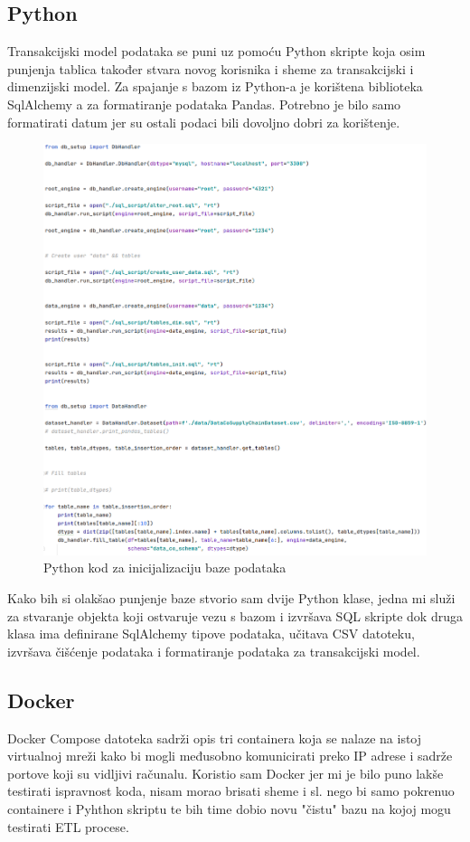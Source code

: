 \documentclass[12pt, oneside]{book}
\begin{document}
\subsection{Python}


Transakcijski model podataka se puni uz pomoću Python skripte koja osim punjenja tablica također stvara novog korisnika i sheme za transakcijski i dimenzijski model. Za spajanje s bazom iz Python-a je korištena biblioteka SqlAlchemy a za formatiranje podataka Pandas. Potrebno je bilo samo formatirati datum jer su ostali podaci bili dovoljno dobri za korištenje.

\begin{figure}[H]
\includegraphics[width=15cm]{images/i14_Python-Init.png}
\centering
\caption{Python kod za inicijalizaciju baze podataka}
\end{figure}

Kako bih si olakšao punjenje baze stvorio sam dvije Python klase, jedna mi služi za stvaranje objekta koji ostvaruje vezu s bazom i izvršava SQL skripte dok druga klasa ima definirane SqlAlchemy tipove podataka, učitava CSV datoteku, izvršava čišćenje podataka i formatiranje podataka za transakcijski model. 


\subsection{Docker}
Docker Compose datoteka sadrži opis tri containera koja se nalaze na istoj virtualnoj mreži kako bi mogli međusobno komunicirati preko IP adrese i sadrže portove koji su vidljivi računalu. Koristio sam Docker jer mi je bilo puno lakše testirati ispravnost koda, nisam morao brisati sheme i sl. nego bi samo pokrenuo containere i Pyhthon skriptu te bih time dobio novu "čistu" bazu na kojoj mogu testirati ETL procese.
\end{document}

